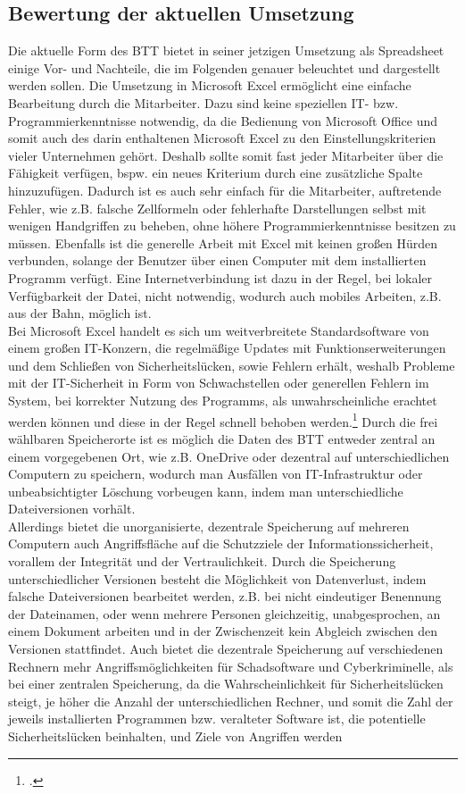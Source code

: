 \subsection{Bewertung der aktuellen Umsetzung}
Die aktuelle Form des BTT bietet in seiner jetzigen Umsetzung als Spreadsheet einige Vor- und Nachteile, die im Folgenden genauer beleuchtet und dargestellt werden sollen. Die Umsetzung in Microsoft Excel ermöglicht eine einfache Bearbeitung durch die Mitarbeiter. Dazu sind keine speziellen IT- bzw. Programmierkenntnisse notwendig, da die Bedienung von Microsoft Office und somit auch des darin enthaltenen Microsoft Excel zu den Einstellungskriterien vieler Unternehmen gehört. Deshalb sollte somit fast jeder Mitarbeiter über die Fähigkeit verfügen, bspw. ein neues Kriterium durch eine zusätzliche Spalte hinzuzufügen. Dadurch ist es auch sehr einfach für die Mitarbeiter, auftretende Fehler, wie z.B. falsche Zellformeln oder fehlerhafte Darstellungen selbst mit wenigen Handgriffen zu beheben, ohne höhere Programmierkenntnisse besitzen zu müssen. Ebenfalls ist die generelle Arbeit mit Excel mit keinen großen Hürden verbunden, solange der Benutzer über einen Computer mit dem installierten Programm verfügt. Eine Internetverbindung ist dazu in der Regel, bei lokaler Verfügbarkeit der Datei, nicht notwendig, wodurch auch mobiles Arbeiten, z.B. aus der Bahn, möglich ist.\\Bei Microsoft Excel handelt es sich um weitverbreitete Standardsoftware von einem großen IT-Konzern, die regelmäßige Updates mit Funktionserweiterungen und dem Schließen von Sicherheitslücken, sowie Fehlern erhält, weshalb Probleme mit der IT-Sicherheit in Form von Schwachstellen oder generellen Fehlern im System, bei korrekter Nutzung des Programms, als unwahrscheinliche erachtet werden können und diese in der Regel schnell behoben werden.\footcite[Vgl.][]{ms-sicherheit} Durch die frei wählbaren Speicherorte ist es möglich die Daten des BTT entweder zentral an einem vorgegebenen Ort, wie z.B. OneDrive oder dezentral auf unterschiedlichen Computern zu speichern, wodurch man Ausfällen von IT-Infrastruktur oder unbeabsichtigter Löschung vorbeugen kann, indem man unterschiedliche Dateiversionen vorhält.\\Allerdings bietet die unorganisierte, dezentrale Speicherung auf mehreren Computern auch Angriffsfläche auf die Schutzziele der Informationssicherheit, vorallem der Integrität und der Vertraulichkeit. Durch die Speicherung unterschiedlicher Versionen besteht die Möglichkeit von Datenverlust, indem falsche Dateiversionen bearbeitet werden, z.B. bei nicht eindeutiger Benennung der Dateinamen, oder wenn mehrere Personen gleichzeitig, unabgesprochen, an einem Dokument arbeiten und in der Zwischenzeit kein Abgleich zwischen den Versionen stattfindet. Auch bietet die dezentrale Speicherung auf verschiedenen Rechnern mehr Angriffsmöglichkeiten für Schadsoftware und Cyberkriminelle, als bei einer zentralen Speicherung, da die Wahrscheinlichkeit für Sicherheitslücken steigt, je höher die Anzahl der unterschiedlichen Rechner, und somit die Zahl der jeweils installierten Programmen bzw. veralteter Software ist, die potentielle Sicherheitslücken beinhalten, und Ziele von Angriffen werden 